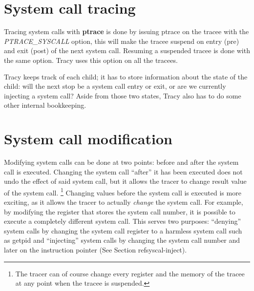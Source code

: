 \documentclass[a4paper, 10pt]{report}
\begin{document}
%

\section{System call tracing}
\label{syscall-trace}

Tracing system calls with \textbf{ptrace} is done by issuing ptrace on the
tracee with the \textit{PTRACE\_SYSCALL} option, this will make the tracee
suspend on entry (pre) and exit (post) of the next system call. Resuming a
suspended tracee is done with the same option. Tracy uses this option on
all the tracees.

Tracy keeps track of each child; it has to store information about the state
of the child: will the next stop be a system call entry or exit, or are we
currently injecting a system call? Aside from those two states, Tracy also
has to do some other internal bookkeeping.


\section{System call modification}

Modifying system calls can be done at two points: before and after the
system call is executed. Changing the system call ``after'' it has been executed
does not undo the effect of said system call, but it allows the tracer to change
result value of the system call.
\footnote{The tracer can of course change every register and the memory of the
tracee at any point when the tracee is suspended.}
Changing values before the system call is executed is more exciting, as it
allows the tracer to actually \textit{change} the system call. For example, by
modifying the register that stores the system call number, it is possible to
execute a completely different system call. This serves two purposes:
``denying'' system calls by changing the system call register to a harmless
system call such as getpid and ``injecting'' system calls by changing the
system call number and later on the instruction pointer (See Section
ref{syscal-inject}).
\end{document}
